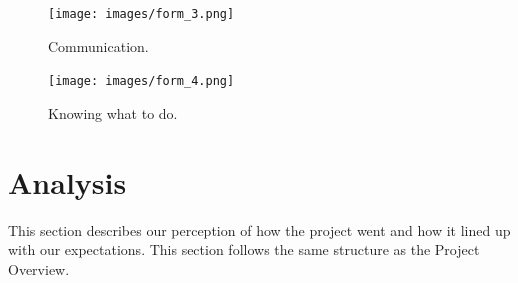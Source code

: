 \documentclass{article}
\begin{document}
        \begin{figure}[!htb]
            \endminipage\hfill
              \texttt{[image: images/form\_3.png]}
              \caption{Communication.}\label{fig:form_3}
            \endminipage\hfill
              \texttt{[image: images/form\_4.png]}
              \caption{Knowing what to do.}\label{fig:form_4}
            \endminipage\hfill
            \endminipage\hfill
        \end{figure}


\section{Analysis \label{analysis}}
    This section describes our perception of how the project went and how it lined up with our expectations.
    This section follows the same structure as the Project Overview.
\end{document}
